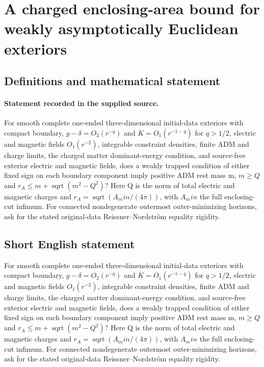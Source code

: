 \documentclass[11pt]{article}
\begin{document}
\section*{A charged enclosing-area bound for weakly asymptotically Euclidean exteriors}\label{30007216}
\subsection{Definitions and mathematical statement}
\paragraph{Statement recorded in the supplied source.}
For smooth complete one-ended three-dimensional initial-data exteriors with compact boundary, $g-\delta =O_2(r^{-q})$ and $K=O_1(r^{-1-q})$ for $q>1/2$, electric and magnetic fields $O_1(r^{-2})$, integrable constraint densities, finite ADM and charge limits, the charged matter dominant-energy condition, and source-free exterior electric and magnetic fields, does a weakly trapped condition of either fixed sign on each boundary component imply positive ADM rest mass m, $m\geq Q$ and $r_A\leq m+\operatorname{sqrt}(m^2-Q^2)$? Here Q is the norm of total electric and magnetic charges and $r_A=\operatorname{sqrt}(A_min/(4\pi ))$, with $A_min$ the full enclosing-cut infimum. For connected nondegenerate outermost outer-minimizing horizons, ask for the stated original-data Reissner–Nordström equality rigidity.
\subsection{Short English statement}
For smooth complete one-ended three-dimensional initial-data exteriors with compact boundary, $g-\delta =O_2(r^{-q})$ and $K=O_1(r^{-1-q})$ for $q>1/2$, electric and magnetic fields $O_1(r^{-2})$, integrable constraint densities, finite ADM and charge limits, the charged matter dominant-energy condition, and source-free exterior electric and magnetic fields, does a weakly trapped condition of either fixed sign on each boundary component imply positive ADM rest mass m, $m\geq Q$ and $r_A\leq m+\operatorname{sqrt}(m^2-Q^2)$? Here Q is the norm of total electric and magnetic charges and $r_A=\operatorname{sqrt}(A_min/(4\pi ))$, with $A_min$ the full enclosing-cut infimum. For connected nondegenerate outermost outer-minimizing horizons, ask for the stated original-data Reissner–Nordström equality rigidity.
\end{document}
